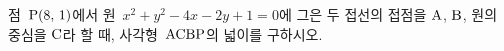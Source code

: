 점~$\mathrm{P}(8,\,1)$에서 원~$x^2+y^2-4x-2y+1=0$에 그은 두 접선의 접점을 $\mathrm{A}$, $\mathrm{B}$, 원의 중심을 $\mathrm{C}$라 할 때, 사각형~$\mathrm{ACBP}$의 넓이를 구하시오.
